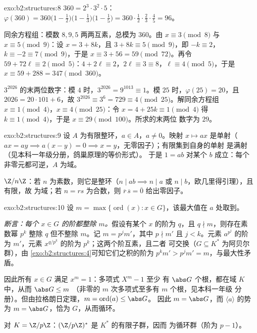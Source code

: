 \begin{solution}{exo:b2:structures:8}
$360 = 2^3 \cdot 3^2 \cdot 5$：
$\varphi(360) = 360\bigl(1 - \tfrac12\bigr)\bigl(1 -
\tfrac13\bigr)\bigl(1 - \tfrac15\bigr) = 360 \cdot \tfrac12 \cdot
\tfrac23 \cdot \tfrac45 = 96$。

同余方程组：模数 $8, 9, 5$ 两两互素，总模为 $360$。由 $x
\equiv 3 \pmod 8$ 与 $x \equiv 5 \pmod 9$：设 $x = 3 + 8k$，且 $3 +
8k \equiv 5 \pmod 9$，即 $-k \equiv 2$，$k \equiv -2 \equiv 7
\pmod 9$，于是 $x \equiv 3 + 56 = 59 \pmod{72}$。再令 $59 + 72\ell \equiv
2 \pmod 5$：$4 + 2\ell \equiv 2$，$2\ell \equiv 3 \equiv 8$，$\ell
\equiv 4 \pmod 5$，于是 $x \equiv 59 + 288 = 347 \pmod{360}$。

$3^{2026}$ 的末两位数字：模 $4$ 时，$3^{2026} = 9^{1013} \equiv
1$。模 $25$ 时，$\varphi(25) = 20$，且 $2026 = 20\cdot101 + 6$，故
$3^{2026} \equiv 3^6 = 729 \equiv 4 \pmod{25}$。解同余方程组 $x \equiv 1
\pmod 4$，$x \equiv 4 \pmod{25}$：令 $x = 4 + 25k \equiv 1 \pmod 4$
得 $k \equiv 1 \pmod 4$，于是 $x \equiv 29 \pmod{100}$。所求的末两位
数字为 $29$。
\end{solution}

\begin{solution}{exo:b2:structures:9}
设 $A$ 为有限整环，$a \in A$，$a \neq 0$。映射
$x \mapsto ax$ 是单射（$ax = ay \implies a(x - y) = 0
\implies x = y$，无零因子）；有限集到自身的单射
是满射（见本科一年级分册，鸽巢原理的等价形式）。
于是 $1 = ab$ 对某个 $b$ 成立：每个非零元都可逆，$A$
为域。

$\Z/n\Z$：若 $n$ 为素数，则它是整环（$n \mid ab
\implies n \mid a$ 或 $n \mid b$，欧几里得引理），且有限，故
为域；若 $n = rs$ 为合数，则 $\overline r\,\overline s =
\overline 0$ 给出零因子。
\end{solution}

\begin{solution}{exo:b2:structures:10}
设 $m = \max\{\operatorname{ord}(x) : x \in G\}$，该最大值在 $a$ 处取到。

\emph{断言：每个 $x \in G$ 的阶都整除 $m$。}假设有某个
$x$ 的阶为 $q$，且 $q \nmid m$，则存在素数幂 $p^k$
整除 $q$ 但不整除 $m$。记 $m = p^j m'$，其中 $p \nmid m'$ 且 $j
< k$。元素 $a^{p^j}$ 的阶为 $m'$，元素
$x^{q/p^k}$ 的阶为 $p^k$；这两个阶互素，且二者
可交换（$G \subseteq K^*$ 为阿贝尔群），由
\cref{exo:b2:structures:4}可知它们之积的阶为 $p^k m' > p^j m'
= m$，与最大性矛盾。

因此所有 $x \in G$ 满足 $x^m = 1$：多项式 $X^m - 1$ 至少
有 $\abs G$ 个根，都在域 $K$ 中，从而 $\abs G \leq m$
（非零的 $m$ 次多项式至多有 $m$ 个根，见本科一年级
分册）。但由拉格朗日定理，$m = \operatorname{ord}(a) \leq \abs G$。
因此 $m = \abs G$，而 $\langle a \rangle$ 的势为 $m =
\abs G$，恰为 $G$，从而循环。

对 $K = \Z/p\Z$：$(\Z/p\Z)^*$ 是 $K^*$ 的有限子群，因而
为循环群（阶为 $p - 1$）。
\end{solution}

